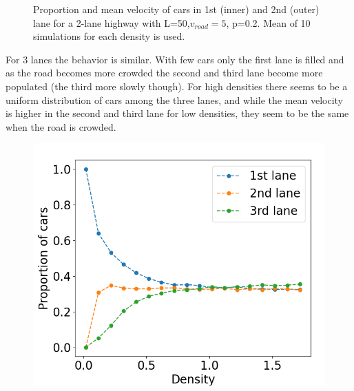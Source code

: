 \documentclass[a4paper,12pt]{article}
\begin{document}
\begin{figure}[H]
\begin{minipage}{.5\textwidth}
    \end{minipage}
    \caption{Proportion and mean velocity of cars in 1st (inner) and 2nd (outer) lane for a 2-lane highway with L=50,$v_{road}=5$, p=0.2. Mean of 10 simulations for each density is used.}
    \label{fig45}
\end{figure}

For 3 lanes the behavior is similar. With few cars only the first lane is filled and as the road becomes more crowded the second and third lane become more populated (the third more slowly though). For high densities there seems to be a uniform distribution of cars among the three lanes, and while the mean velocity is higher in the second and third lane for low densities, they seem to be the same when the road is crowded.
\begin{figure}[H]
	 \centering
    \begin{minipage}{.5\textwidth}
        \centering
        \includegraphics[scale=0.37]{fig8.png}
    \end{minipage}%
    \begin{minipage}{.5\textwidth}
        \centering

\end{minipage}
\end{figure}
\end{document}
